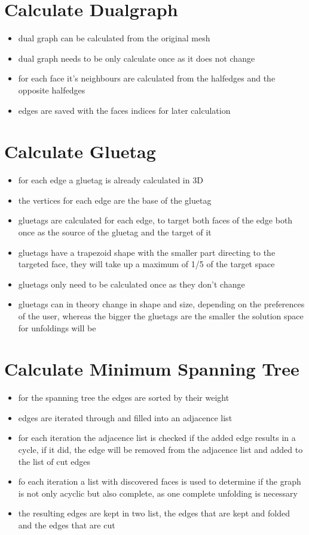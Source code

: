 \documentclass[draft,final]{vutinfth} %
\begin{document}
\section{Calculate Dualgraph}

\begin{itemize}
	\item dual graph can be calculated from the original mesh 
	\item dual graph needs to be only calculate once as it does not change
	\item for each face it's neighbours are calculated from the halfedges and the opposite halfedges
	\item edges are saved with the faces indices for later calculation
\end{itemize}

\section{Calculate Gluetag}

\begin{itemize}
	\item for each edge a gluetag is already calculated in 3D
	\item the vertices for each edge are the base of the gluetag
	\item gluetags are calculated for each edge, to target both faces of the edge both once as the source of the gluetag and the target of it
	\item gluetags have a trapezoid shape with the smaller part directing to the targeted face, they will take up a maximum of 1/5 of the target space
	\item gluetags only need to be calculated once as they don't change
	\item gluetags can in theory change in shape and size, depending on the preferences of the user, whereas the bigger the gluetags are the smaller the solution space for unfoldings will be
\end{itemize}

\section{Calculate Minimum Spanning Tree}

\begin{itemize}
	\item for the spanning tree the edges are sorted by their weight
	\item edges are iterated through and filled into an adjacence list
	\item for each iteration the adjacence list is checked if the added edge results in a cycle, if it did, the edge will be removed from the adjacence list and added to the list of cut edges
	\item fo each iteration a list with discovered faces is used to determine if the graph is not only acyclic but also complete, as one complete unfolding is necessary
	\item the resulting edges are kept in two list, the edges that are kept and folded and the edges that are cut
\end{itemize}
\end{document}
